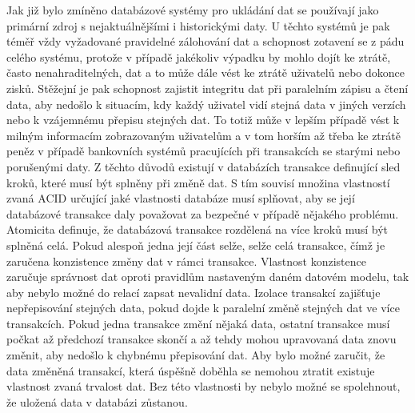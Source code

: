 \begin{itemize}
\begin{itemize}
		Jak již bylo zmíněno databázové systémy pro ukládání dat se používají jako primární zdroj s nejaktuálnějšími i
		historickými daty.
		U těchto systémů je pak téměř vždy vyžadované pravidelné zálohování dat a schopnost zotavení se z pádu celého
		systému, protože v případě jakékoliv výpadku by mohlo dojít ke ztrátě, často nenahraditelných, dat a to může
		dále vést ke ztrátě uživatelů nebo dokonce zisků.
		Stěžejní je pak schopnost zajistit integritu dat při paralelním zápisu a čtení data, aby nedošlo k situacím,
		kdy každý uživatel vidí stejná data v jiných verzích nebo k vzájemnému přepisu stejných dat.
		To totiž může v lepším případě vést k milným informacím zobrazovaným uživatelům a v tom horším až třeba ke ztrátě
		peněz v případě bankovních systémů pracujících při transakcích se starými nebo porušenými daty.
		Z těchto důvodů existují v databázích transakce definující sled kroků, které musí být splněny při změně dat.
		S tím souvisí množina vlastností zvaná \noindent\Ac{ACID} určující jaké vlastnosti databáze musí
		splňovat, aby se její databázové transakce daly považovat za bezpečné v případě nějakého problému.
		Atomicita definuje, že databázová transakce rozdělená na více kroků musí být splněná celá.
		Pokud alespoň jedna její část selže, selže celá transakce, čímž je zaručena konzistence změny dat v rámci transakce.
		Vlastnost konzistence zaručuje správnost dat oproti pravidlům nastaveným daném datovém modelu, tak aby nebylo možné
		do relací zapsat nevalidní data.
		Izolace transakcí zajišťuje nepřepisování stejných data, pokud dojde k paralelní změně stejných dat ve více
		transakcích.
		Pokud jedna transakce změní nějaká data, ostatní transakce musí počkat až předchozí transakce skončí a až tehdy
		mohou upravovaná data znovu změnit, aby nedošlo k chybnému přepisování dat.
		Aby bylo možné zaručit, že data změněná transakcí, která úspěšně doběhla se nemohou ztratit existuje vlastnost
		zvaná trvalost dat.
		Bez této vlastnosti by nebylo možné se spolehnout, že uložená data v databázi zůstanou. \cite{acid-compliance}


\end{itemize}
\end{itemize}

